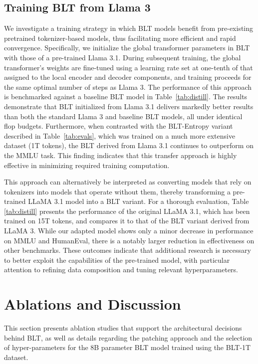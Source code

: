 \subsection{Training {\textsc BLT} from Llama 3}
\label{sec:distillation}
We investigate a training strategy in which {\textsc BLT} models benefit from pre-existing pretrained tokenizer-based models, thus facilitating more efficient and rapid convergence. Specifically, we initialize the global transformer parameters in {\textsc BLT} with those of a pre-trained Llama 3.1. During subsequent training, the global transformer's weights are fine-tuned using a learning rate set at one-tenth of that assigned to the local encoder and decoder components, and training proceeds for the same optimal number of steps as Llama 3. The performance of this approach is benchmarked against a baseline {\textsc BLT} model in Table~\ref{tab:distill}. The results demonstrate that {\textsc BLT} initialized from Llama 3.1 delivers markedly better results than both the standard Llama 3 and baseline {\textsc BLT} models, all under identical flop budgets. Furthermore, when contrasted with the {\textsc BLT}-Entropy variant described in Table~\ref{tab:evals}, which was trained on a much more extensive dataset (1T tokens), the {\textsc BLT} derived from Llama 3.1 continues to outperform on the MMLU task. This finding indicates that this transfer approach is highly effective in minimizing required training computation.

This approach can alternatively be interpreted as converting models that rely on tokenizers into models that operate without them, thereby transforming a pre-trained LLaMA 3.1 model into a {\textsc BLT} variant. For a thorough evaluation, Table \ref{tab:distill} presents the performance of the original LLaMA 3.1, which has been trained on 15T tokens, and compares it to that of the {\textsc BLT} variant derived from LLaMA 3. While our adapted model shows only a minor decrease in performance on MMLU and HumanEval, there is a notably larger reduction in effectiveness on other benchmarks. These outcomes indicate that additional research is necessary to better exploit the capabilities of the pre-trained model, with particular attention to refining data composition and tuning relevant hyperparameters.

\section{Ablations and Discussion}
\label{section:ablations}
This section presents ablation studies that support the architectural decisions behind {\textsc BLT}, as well as details regarding the patching approach and the selection of hyper-parameters for the 8B parameter {\textsc BLT} model trained using the {\textsc BLT}-1T dataset.

